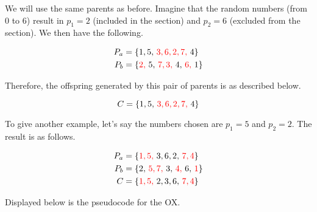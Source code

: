 We will use the same parents as before. Imagine that the random numbers (from $0$ to $6$) result in $p_{1} = 2$ (included in the section) and $p_{2} = 6$ (excluded from the section). We then have the following.

\begin{align}
    P_{a} &= \color{black}{ \{ 1, 5,\ } \color{red}{3, 6, 2, 7,\ } \color{black}{4} \}\\
    P_{b} &= \color{black}{\{} \color{red}{2,\ } \color{black}{5,\ } \color{red}{7, 3,\ } \color{black}{4,\ } \color{red}{6,\ } \color{black}{1} \}
\end{align}

Therefore, the offspring generated by this pair of parents is as described below.

\begin{equation}
    C = \color{black}{\{ 1, 5,\ } \color{red}{3, 6, 2, 7,\ } \color{black}{4 \}}
\end{equation}

To give another example, let's say the numbers chosen are $p_{1} = 5$ and $p_{2} = 2$. The result is as follows.

\begin{align}
    P_{a} &= \color{black}{\{} \color{red}{1, 5,\ } \color{black}{3, 6, 2,\ } \color{red}{7, 4} \color{black}{\}}\\
    P_{b} &= \color{black}{\{ 2,\ } \color{red}{5, 7,\ } \color{black}{3,\ } \color{red}{4,\ } \color{black}{6,\ } \color{red}{1} \color{black}{\}}\\
    C &= \color{black}{\{} \color{red}{1, 5,\ } \color{black}{2, 3, 6,\ } \color{red}{7, 4} \color{black}{\}}
\end{align}

Displayed below is the pseudocode for the OX.

